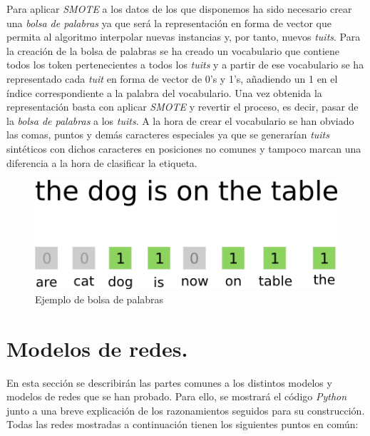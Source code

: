 \documentclass[11pt]{article}
\begin{document}
Para aplicar \textit{SMOTE} a los datos de los que disponemos ha sido necesario crear una \textit{bolsa de palabras} ya que será la representación en forma de vector que permita al algoritmo interpolar nuevas instancias y, por tanto, nuevos \textit{tuits}. Para la creación de la bolsa de palabras se ha creado un vocabulario que contiene todos los token pertenecientes a todos los \textit{tuits} y a partir de ese vocabulario se ha representado cada \textit{tuit} en forma de vector de 0's y 1's, añadiendo un 1 en el índice correspondiente a la palabra del vocabulario. Una vez obtenida la representación basta con aplicar \textit{SMOTE} y revertir el proceso, es decir, pasar de la \textit{bolsa de palabras} a los \textit{tuits}. A la hora de crear el vocabulario se han obviado las comas, puntos y demás caracteres especiales ya que se generarían \textit{tuits} sintéticos con dichos caracteres en posiciones no comunes y tampoco marcan una diferencia a la hora de clasificar la etiqueta.

\begin{figure}[H]
\centering
\includegraphics[scale=0.5]{images/bag_of_words.png}
\caption{Ejemplo de bolsa de palabras}
\end{figure}

\section{Modelos de redes.} \label{models}

En esta sección se describirán las partes comunes a los distintos modelos y modelos de redes que se han probado. Para ello, se mostrará el código \textit{Python} junto a una breve explicación de los razonamientos seguidos para su construcción. \\

Todas las redes mostradas a continuación tienen los siguientes puntos en común:
\end{document}
